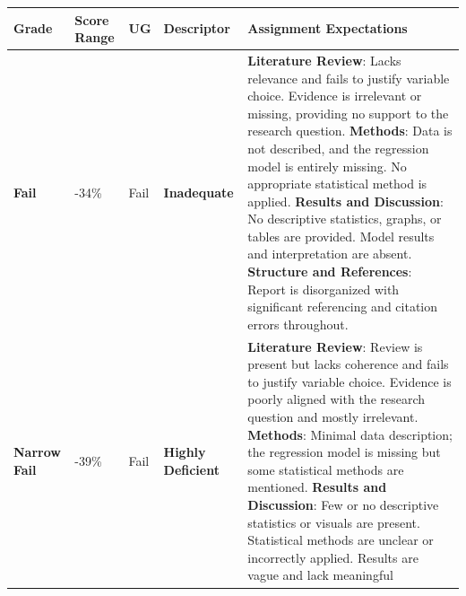 \documentclass[
  letterpaper,
  DIV=11,
  numbers=noendperiod]{scrreprt}
\newcounter{none} %
\begin{document}
{\def\LTcaptype{none} %
\begin{longtable}[]{@{}
  >{\raggedright\arraybackslash}p{}
  >{\raggedright\arraybackslash}p{}
  >{\raggedright\arraybackslash}p{}
  >{\raggedright\arraybackslash}p{}
  >{\raggedright\arraybackslash}p{}@{}}
\toprule\noalign{}
\begin{minipage}[b]{\linewidth}\raggedright
\textbf{Grade}
\end{minipage} & \begin{minipage}[b]{\linewidth}\raggedright
\textbf{Score Range}
\end{minipage} & \begin{minipage}[b]{\linewidth}\raggedright
\textbf{UG}
\end{minipage} & \begin{minipage}[b]{\linewidth}\raggedright
\textbf{Descriptor}
\end{minipage} & \begin{minipage}[b]{\linewidth}\raggedright
\textbf{Assignment Expectations}
\end{minipage} \\
\midrule\noalign{}
\endhead
\bottomrule\noalign{}
\endlastfoot
\textbf{Fail} & 0-34\% & Fail & \textbf{Inadequate} & \textbf{Literature
Review}: Lacks relevance and fails to justify variable choice. Evidence
is irrelevant or missing, providing no support to the research question.
\textbf{Methods}: Data is not described, and the regression model is
entirely missing. No appropriate statistical method is applied.
\textbf{Results and Discussion}: No descriptive statistics, graphs, or
tables are provided. Model results and interpretation are absent.
\textbf{Structure and References}: Report is disorganized with
significant referencing and citation errors throughout. \\
\textbf{Narrow Fail} & 35-39\% & Fail & \textbf{Highly Deficient} &
\textbf{Literature Review}: Review is present but lacks coherence and
fails to justify variable choice. Evidence is poorly aligned with the
research question and mostly irrelevant. \textbf{Methods}: Minimal data
description; the regression model is missing but some statistical
methods are mentioned. \textbf{Results and Discussion}: Few or no
descriptive statistics or visuals are present. Statistical methods are
unclear or incorrectly applied. Results are vague and lack meaningful

\end{longtable}}
\end{document}
